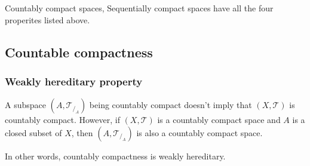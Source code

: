 	Countably compact spaces, Sequentially compact spaces have all the four properites listed above.

\subsection{Countable compactness}
\subsubsection{Weakly hereditary property}
	A subspace $(A,\mathcal{T}_{/_A})$ being countably compact doesn't imply that $(X,\mathcal{T})$ is countably compact.
	However, if $(X,\mathcal{T})$ is a countably compact space and \textsf{$A$ is a closed subset of $X$}, then $(A,\mathcal{T}_{/_A})$ is also a countably compact space.
\begin{commentary}
	In other words, countably compactness is weakly hereditary.
\end{commentary}

